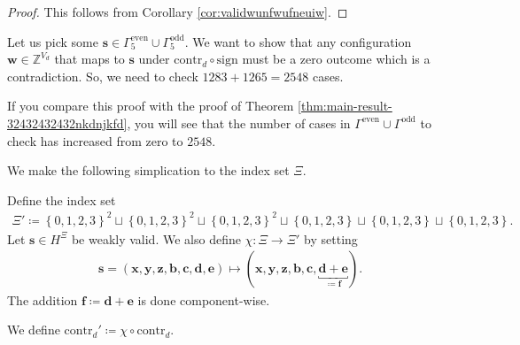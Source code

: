 \begin{proof}
    This follows from Corollary \ref{cor:validwunfwufneuiw}.
\end{proof}

Let us pick some \( \mathbf{s} \in \Gamma^{\mathrm{even}}_5 \cup \Gamma^{\mathrm{odd}}_5 \). We want to show that any configuration \( \mathbf{w} \in \mathbb{Z}^{V_d} \) that maps to \( \mathbf{s} \) under \( \mathrm{contr}_d \circ \mathrm{sign} \) must be a zero outcome which is a contradiction. So, we need to check \( 1283 + 1265 = 2548 \) cases.

\begin{remark}
    If you compare this proof with the proof of Theorem \ref{thm:main-result-32432432432nkdnjkfd}, you will see that the number of cases in \( \Gamma^{\mathrm{even}} \cup \Gamma^{\mathrm{odd}} \) to check has increased from zero to \( 2548 \).
\end{remark}

We make the following simplication to the index set \( \Xi \).

\begin{definition}
    Define the index set
    \begin{align*}
        \Xi' \coloneqq \left\{ 0,1,2,3 \right\}^2 \sqcup \left\{ 0,1,2,3 \right\}^2 \sqcup \left\{ 0,1,2,3 \right\}^2 \sqcup \left\{ 0,1,2,3 \right\} \sqcup \left\{ 0,1,2,3 \right\} \sqcup \left\{ 0,1,2,3 \right\}.
    \end{align*}
    Let \( \mathbf{s} \in H^{\Xi} \) be weakly valid. We also define \( \chi: \Xi \to \Xi' \) by setting
    \begin{align*}
        \mathbf{s} = (\mathbf{x}, \mathbf{y}, \mathbf{z}, \mathbf{b}, \mathbf{c}, \mathbf{d}, \mathbf{e}) \mapsto (\mathbf{x}, \mathbf{y}, \mathbf{z}, \mathbf{b}, \mathbf{c}, \underbracket{\mathbf{d} + \mathbf{e}}_{\coloneqq \mathbf{f}}).
    \end{align*}
    The addition \( \mathbf{f} \coloneqq \mathbf{d} + \mathbf{e} \) is done component-wise.
\end{definition}

\begin{definition}
    We define \( \mathrm{contr}_d' \coloneqq \chi \circ \mathrm{contr}_d \).
\end{definition}

